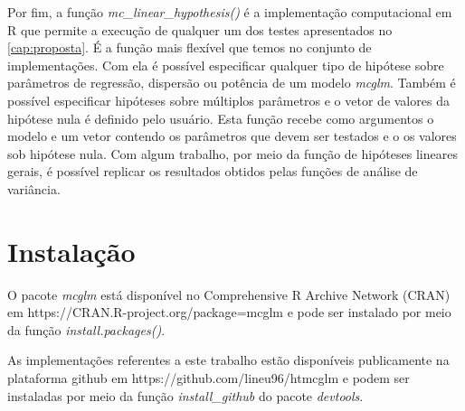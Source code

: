 Por fim, a função \emph{mc\_linear\_hypothesis()} é a implementação computacional em R que permite a execução de qualquer um dos testes apresentados no \autoref{cap:proposta}. É a função mais flexível que temos no conjunto de implementações. Com ela é possível especificar qualquer tipo de hipótese sobre parâmetros de regressão, dispersão ou potência de um modelo \emph{mcglm}. Também é possível especificar hipóteses sobre múltiplos parâmetros e o vetor de valores da hipótese nula é definido pelo usuário. Esta função recebe como argumentos o modelo e um vetor contendo os parâmetros que devem ser testados e o os valores sob hipótese nula. Com algum trabalho, por meio da função de hipóteses lineares gerais, é possível replicar os resultados obtidos pelas funções de análise de variância.


\section{Instalação}



O pacote \emph{mcglm} está disponível no Comprehensive R Archive Network (CRAN) em https://CRAN.R-project.org/package=mcglm e pode ser instalado por meio da função \emph{install.packages()}.

\begin{knitrout}
\color{fgcolor}\begin{kframe}
\begin{alltt}
\hlstd{(}\hlstd{)}
\end{alltt}
\end{kframe}
\end{knitrout}

As implementações referentes a este trabalho estão disponíveis publicamente na plataforma github em https://github.com/lineu96/htmcglm e podem ser instaladas por meio da função \emph{install\_github} do pacote \emph{devtools}.

\begin{knitrout}
\color{fgcolor}\begin{kframe}
\begin{alltt}
\hlstd{(}\hlstd{)}
\end{alltt}
\end{kframe}
\end{knitrout}


